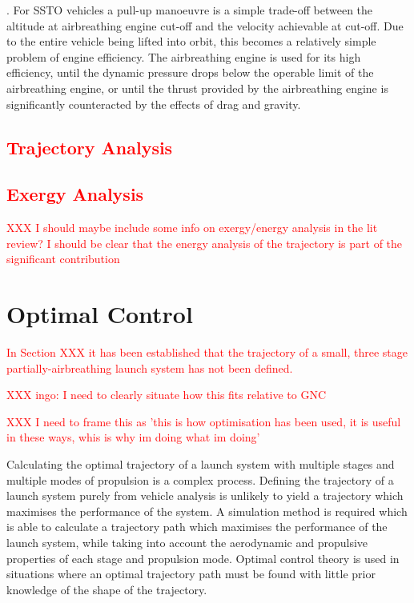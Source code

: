 . For SSTO vehicles a pull-up manoeuvre is a simple trade-off between the altitude at airbreathing engine cut-off and the velocity achievable at cut-off. Due to the entire vehicle being lifted into orbit, this becomes a relatively simple problem of engine efficiency. The airbreathing engine is used for its high efficiency, until the dynamic pressure drops below the operable limit of the airbreathing engine, or until the thrust provided by the airbreathing engine is significantly counteracted by the effects of drag and gravity. 

\textcolor{red}{
	\section{Trajectory Analysis}
}

\textcolor{red}{
	\subsection{Exergy Analysis}
}
\textcolor{red}{XXX I should maybe include some info on exergy/energy analysis in the lit review? I should be clear that the energy analysis of the trajectory is part of the significant contribution }


\section{Optimal Control}\label{sec:Optimisation}
\textcolor{red}{In Section XXX it has been established that the trajectory of a small, three stage partially-airbreathing launch system has not been defined.}

\textcolor{red}{XXX ingo: I need to clearly situate how this fits relative to GNC}

\textcolor{red}{XXX I need to frame this as 'this is how optimisation has been used, it is useful in these ways, whis is why im doing what im doing'}

Calculating the optimal trajectory of a launch system with multiple stages and multiple modes of propulsion is a complex process. 
Defining the trajectory of a launch system purely from vehicle analysis is unlikely to yield a trajectory which maximises the performance of the system.
A simulation method is required which is able to calculate a trajectory path which maximises the performance of the launch system, while taking into account the aerodynamic and propulsive properties of each stage and propulsion mode. 
Optimal control theory is used in situations where an optimal trajectory path must be found with little prior knowledge of the shape of the trajectory. 

